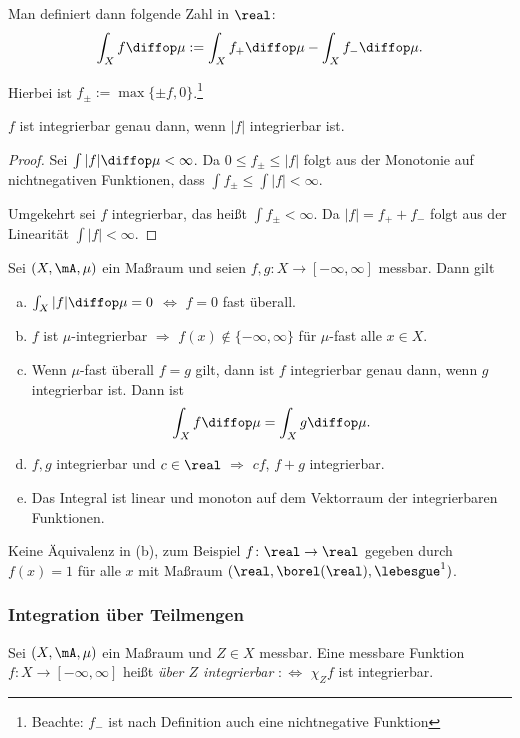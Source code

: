 Man definiert dann folgende Zahl in $\real$:
\[ \int_X f \diffop \mu := \int_X f_+ \diffop \mu - \int_X f_- \diffop \mu. \]

Hierbei ist $f_\pm := \max \{ \pm f, 0 \}$.\footnote{Beachte: $f_-$ ist nach Definition auch eine nichtnegative Funktion}

\begin{rmrk}
 $f$ ist integrierbar genau dann, wenn $|f|$ integrierbar ist.
 \begin{proof}
  Sei $\int |f| \diffop \mu < \infty$. Da $0 \le f_\pm \le |f|$ folgt aus der Monotonie auf nichtnegativen Funktionen, dass $\int f_\pm \le \int |f| < \infty$.
  
  Umgekehrt sei $f$ integrierbar, das heißt $\int f_\pm < \infty$. Da $|f| = f_+ + f_-$ folgt aus der Linearität $\int |f| < \infty$.
 \end{proof}
\end{rmrk}

\begin{thm}
 Sei $(X,\mA,\mu)$ ein Maßraum und seien $f,g:X \to [-\infty, \infty]$ messbar. Dann gilt
 \begin{enumerate}[(a)]
  \item $\int_X |f| \diffop \mu = 0$ $\Leftrightarrow$ $f=0$ fast überall.
  \item $f$ ist $\mu$-integrierbar $\Rightarrow$ $f(x) \notin \{ -\infty, \infty \}$ für $\mu$-fast alle\footnotemark{} $x \in X$.
  \item Wenn $\mu$-fast überall $f=g$ gilt, dann ist $f$ integrierbar genau dann, wenn $g$ integrierbar ist. Dann ist
  \[ \int_X f \diffop \mu = \int_X g \diffop \mu. \]
  \item $f,g$ integrierbar und $c \in \real$ $\Rightarrow$ $cf$, $f+g$ integrierbar.
  \item Das Integral ist linear und monoton auf dem Vektorraum der integrierbaren Funktionen.
 \end{enumerate}
\end{thm}

\begin{rmrk}
 Keine Äquivalenz in (b), zum Beispiel $f\colon\real \to \real$ gegeben durch $f(x) = 1$ für alle $x$ mit Maßraum $(\real, \borel(\real), \lebesgue^1 )$.
\end{rmrk}

\subsubsection{Integration über Teilmengen}
 Sei $(X,\mA,\mu)$ ein Maßraum und $Z \in X$ messbar. Eine messbare Funktion $f:X \to [-\infty,\infty]$ heißt \emph{über $Z$ integrierbar} $:\Leftrightarrow$ $\chi_Z f$ ist integrierbar. 
 
